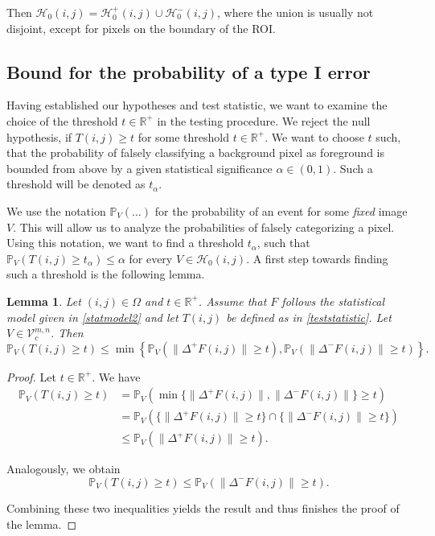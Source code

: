 \documentclass[a4paper,12pt]{article}
\newcommand{\norm}[1]{\lVert#1\rVert}
\theoremstyle{plain}
\newtheorem{lemma}[theorem]{Lemma}
\theoremstyle{definition}
\numberwithin{equation}{section}
\begin{document}
Then $\mathcal{H}_0(i, j) = \mathcal{H}_0^+(i, j) \cup \mathcal{H}_0^-(i, j)$, where the union is usually not disjoint, except for pixels on the boundary of the ROI.



\subsection{Bound for the probability of a type I error}\label{section: boundtypeIerror}

Having established our hypotheses and test statistic, we want to examine the choice of the threshold $t \in \mathbb{R}^+$ in the testing procedure. We reject the null hypothesis, if $T(i, j) \geq t$ for some threshold $t \in \mathbb{R}^+$. We want to choose $t$ such, that the probability of falsely classifying a background pixel as foreground is bounded from above by a given statistical significance $\alpha \in (0, 1)$. Such a threshold will be denoted as $t_\alpha$.

We use the notation $\mathbb{P}_V( \ldots )$ for the probability of an event for some \emph{fixed} image $V$. This will allow us to analyze the probabilities of falsely categorizing a pixel. Using this notation, we want to find a threshold $t_\alpha$, such that $\mathbb{P}_V( T(i, j) \geq t_\alpha ) \leq \alpha$ for every $V \in \mathcal{H}_0(i, j)$. A first step towards finding such a threshold is the following lemma.

\begin{lemma}\label{lem: typeIbound}
	Let $(i, j) \in \Omega$ and $t \in \mathbb{R}^+$. Assume that $F$ follows the statistical model given in \eqref{statmodel2} and let $T(i, j)$ be defined as in \eqref{teststatistic}. Let $V \in \mathcal{V}_c^{m, n}$. Then
	\begin{equation}
		\mathbb{P}_V( T(i, j) \geq t ) \leq \min \left\{ \mathbb{P}_V( \norm{\Delta^+ F(i, j)} \geq t ), \mathbb{P}_V( \norm{\Delta^- F(i, j)} \geq t ) \right\}.
	\end{equation}
\end{lemma}
\begin{proof}
	Let $t \in \mathbb{R}^+$. We have
	\begin{align*}
		\mathbb{P}_V( T(i, j) \geq t ) &= \mathbb{P}_V( \min \{ \norm{\Delta^+ F(i, j)}, \norm{\Delta^- F(i, j)} \} \geq t ) \\
		&= \mathbb{P}_V( \{ \norm{\Delta^+ F(i, j)} \geq t \} \cap \{ \norm{\Delta^- F(i, j)} \geq t \} ) \\
		&\leq \mathbb{P}_V( \norm{\Delta^+ F(i, j)} \geq t ).
	\end{align*}
	
	Analogously, we obtain
	\begin{equation*}
		\mathbb{P}_V( T(i, j) \geq t ) \leq \mathbb{P}_V( \norm{\Delta^- F(i, j)} \geq t ).
	\end{equation*}
	
	Combining these two inequalities yields the result and thus finishes the proof of the lemma.
\end{proof}
\end{document}
